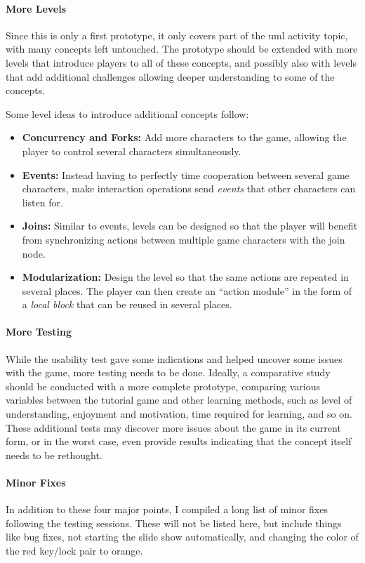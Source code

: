 \paragraph{More Levels} Since this is only a first prototype, it only covers part of the \gls{uml} activity topic, with many concepts left untouched. The prototype should be extended with more levels that introduce players to all of these concepts, and possibly also with levels that add additional challenges allowing deeper understanding to some of the concepts.

\noindent
Some level ideas to introduce additional concepts follow:
\begin{itemize}
	\item{\textbf{Concurrency and Forks:}} Add more characters to the game, allowing the player to control several characters simultaneously.
	\item{\textbf{Events:}} Instead having to perfectly time cooperation between several game characters, make interaction operations send \emph{events} that other characters can listen for.
	\item{\textbf{Joins:}} Similar to events, levels can be designed so that the player will benefit from synchronizing actions between multiple game characters with the join node.
	\item{\textbf{Modularization:}} Design the level so that the same actions are repeated in several places. The player can then create an ``action module'' in the form of a \emph{local block} that can be reused in several places.
\end{itemize}

\paragraph{More Testing} While the usability test gave some indications and helped uncover some issues with the game, more testing needs to be done. Ideally, a comparative study should be conducted with a more complete prototype, comparing various variables between the tutorial game and other learning methods, such as level of understanding, enjoyment and motivation, time required for learning, and so on. These additional tests may discover more issues about the game in its current form, or in the worst case, even provide results indicating that the concept itself needs to be rethought.

\paragraph{Minor Fixes} In addition to these four major points, I compiled a long list of minor fixes following the testing sessions. These will not be listed here, but include things like bug fixes, not starting the slide show automatically, and changing the color of the red key/lock pair to orange.

